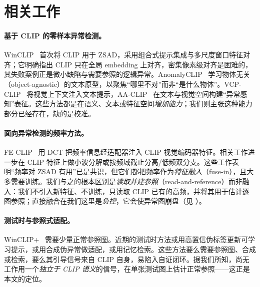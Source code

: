 \section{相关工作}
\label{sec:related}

\paragraph{基于 CLIP 的零样本异常检测。}
WinCLIP~\cite{jeong2023winclip} 首次将 CLIP 用于 ZSAD，采用组合式提示集成与多尺度窗口特征对齐；它明确指出 CLIP 只在全局 embedding 上对齐，密集像素级对齐是困难的，其失败案例正是微小缺陷与需要参照的逻辑异常。AnomalyCLIP~\cite{zhou2024anomalyclip} 学习物体无关（object-agnostic）的文本原型，以聚焦“哪里不对”而非“是什么物体”。VCP-CLIP~\cite{qu2024vcpclip} 将视觉上下文注入文本提示，AA-CLIP~\cite{ma2025aaclip} 在文本与视觉空间构建“异常感知”表征。这些方法都是在语义、文本或特征空间\emph{增加能力}；我们则主张这种能力部分已经存在，缺的是校准。

\paragraph{面向异常检测的频率方法。}
FE-CLIP~\cite{gong2025feclip} 用 DCT 把频率信息经适配器注入 CLIP 视觉编码器特征。相关工作进一步在 CLIP 特征上做小波分解或按频域截止分高/低频双分支。这些工作表明“频率对 ZSAD 有用”已是共识，但它们都把频率作为\emph{特征融入}（fuse-in），且大多需要训练。我们与之的根本区别是\emph{读取并建参照}（read-and-reference）而非融入：我们不引入新特征、不训练，只读取 CLIP 已有的高频，并将其用于估计逐图参照；直接融合在我们这里是\emph{负控}，它会使异常图崩盘（见 ）。

\paragraph{测试时与参照式适配。}
WinCLIP+~\cite{jeong2023winclip} 需要少量正常参照图。近期的测试时方法或用高置信伪标签更新可学习提示，或用合成伪异常做适配，或用记忆检索。这些方法要么需要参照图、合成或检索，要么其引导信号来自 CLIP 自身，易陷入自证闭环。据我们所知，尚无工作用一个\emph{独立于 CLIP 语义}的信号，在单张测试图上估计正常参照——这正是本文的定位。

